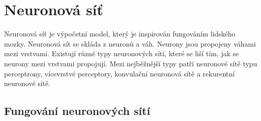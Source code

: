 \section{Neuronová síť}
Neuronová síť je výpočetní model, který je inspirován fungováním lidského mozky.
Neuronová sít se skláda z neuronů a váh.
Neurony jsou propojeny váhami mezi vrstvami.
Existují různé typy neuronových sítí, které se liší tím, jak se neurony mezi vrstvami propojují.
Mezi nejběžnější typy patří neuronové sítě typu perceptrony, vícevrstvé perceptory, konvulační neuronová sítě a rekurentní neuronové sítě.

\subsection{Fungování neuronových sítí}
